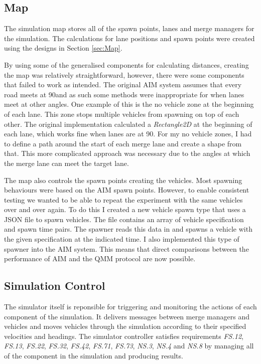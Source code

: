 \subsection{Map}
\label{subsec:Map}
The simulation map stores all of the spawn points, lanes and merge managers for the simulation. The calculations for lane positions and spawn points were created using the designs in Section \ref{sec:Map}. 

By using some of the generalised components for calculating distances, creating the map was relatively straightforward, however, there were some components that failed to work as intended. The original AIM system assumes that every road meets at 90\degree and as such some methods were inappropriate for when lanes meet at other angles. One example of this is the no vehicle zone at the beginning of each lane. This zone stops multiple vehicles from spawning on top of each other. The original implementation calculated a \emph{Rectangle2D} at the beginning of each lane, which works fine when lanes are at 90\degree. For my no vehicle zones, I had to define a path around the start of each merge lane and create a shape from that. This more complicated approach was necessary due to the angles at which the merge lane can meet the target lane. 

The map also controls the spawn points creating the vehicles. Most spawning behaviours were based on the AIM spawn points. However, to enable consistent testing we wanted to be able to repeat the experiment with the same vehicles over and over again. To do this I created a new vehicle spawn type that uses a JSON file to spawn vehicles. The file contains an array of vehicle specification and spawn time pairs. The spawner reads this data in and spawns a vehicle with the given specification at the indicated time. I also implemented this type of spawner into the AIM system. This means that direct comparisons between the performance of AIM and the QMM protocol are now possible.

\subsection{Simulation Control}
\label{subsec:Simulation Control}
The simulator itself is reponsible for triggering and monitoring the actions of each component of the simulation. It delivers messages between merge managers and vehicles and moves vehicles through the simulation according to their specified velocities and headings. The simulator controller satisfies requirements \emph{FS.12}, \emph{FS.13}, \emph{FS.22}, \emph{FS.32}, \emph{FS.42}, \emph{FS.71}, \emph{FS.73}, \emph{NS.3}, \emph{NS.4} and \emph{NS.8} by managing all of the component in the simulation and producing results.


